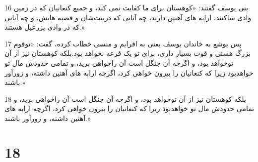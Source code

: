 \par 16 بنی یوسف گفتند: «کوهستان برای ما کفایت نمی کند، و جمیع کنعانیان که در زمین وادی ساکنند، ارابه های آهنین دارند، چه آنانی که دربیت‌شان و قصبه هایش، و چه آنانی که در وادی یزرعیل هستند.»
\par 17 پس یوشع به خاندان یوسف یعنی به افرایم و منسی خطاب کرده، گفت: «توقوم بزرگ هستی و قوت بسیار داری، برای تو یک قرعه نخواهد بود.بلکه کوهستان نیز از آن توخواهد بود، و اگر‌چه آن جنگل است آن راخواهی برید، و تمامی حدودش مال تو خواهدبود زیرا که کنعانیان را بیرون خواهی کرد، اگر‌چه ارابه های آهنین داشته، و زورآور باشند.»
\par 18 بلکه کوهستان نیز از آن توخواهد بود، و اگر‌چه آن جنگل است آن راخواهی برید، و تمامی حدودش مال تو خواهدبود زیرا که کنعانیان را بیرون خواهی کرد، اگر‌چه ارابه های آهنین داشته، و زورآور باشند.»
 
\chapter{18}

